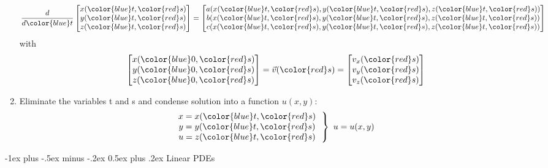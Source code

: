 \documentclass[10pt,landscape]{article}
\makeatletter
\renewcommand{\section}{\@startsection{section}{1}{0mm}%
                                {-1ex plus -.5ex minus -.2ex}%
                                {0.5ex plus .2ex}%
                                {\normalfont\large\bfseries}}
\makeatother
\begin{document}
\begin{multicols}{3}
\begin{enumerate}
{		\begin{align*}
			\frac{d}{d{\color{blue}t}}
			\begin{bmatrix}
				x({\color{blue}t}, {\color{red}s}) \\
				y({\color{blue}t}, {\color{red}s}) \\
				z({\color{blue}t}, {\color{red}s})
			\end{bmatrix}
			=
			\begin{bmatrix}
				a(x({\color{blue}t},{\color{red}s}), y({\color{blue}t},{\color{red}s}), z({\color{blue}t}, {\color{red}s})) \\
				b(x({\color{blue}t},{\color{red}s}), y({\color{blue}t},{\color{red}s}), z({\color{blue}t}, {\color{red}s})) \\
				c(x({\color{blue}t},{\color{red}s}), y({\color{blue}t},{\color{red}s}), z({\color{blue}t}, {\color{red}s}))
			\end{bmatrix}
		\end{align*}
		with
		\begin{align*}
			\begin{bmatrix}
				x({\color{blue}0}, {\color{red}s}) \\
				y({\color{blue}0}, {\color{red}s}) \\
				z({\color{blue}0}, {\color{red}s})
			\end{bmatrix}
			=
			\vec{v}({\color{red}s})
			=
			\begin{bmatrix}
				v_x({\color{red}s} ) \\
				v_y({\color{red}s}) \\
				v_z({\color{red}s})
			\end{bmatrix}
		\end{align*}
	}
	\item{
		Eliminate the variables {\color{blue}t} and {\color{red}s} and condense solution into a function $u(x, y)$:
		\begin{align*}
			\left.
			\begin{matrix}
				x=x({\color{blue}t},{\color{red}s}) \\
				y=y({\color{blue}t},{\color{red}s}) \\
				u=z({\color{blue}t},{\color{red}s})
			\end{matrix}
			\ \ \right\}
			\ u=u(x,y)
		\end{align*}
	}
\end{enumerate}

\section{Linear PDEs}

\end{multicols}
\end{document}
